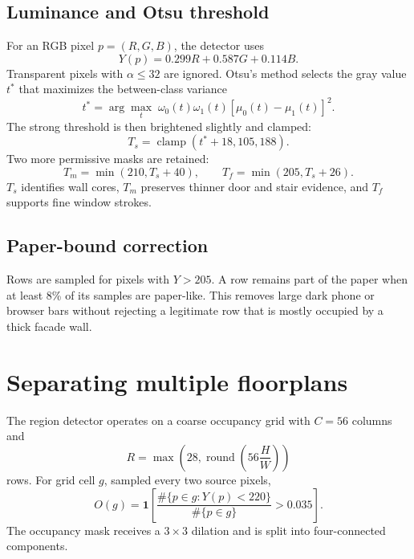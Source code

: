 \documentclass[11pt,a4paper]{article}
\newcommand{\ind}{\mathbf{1}}
\newcommand{\clamp}{\operatorname{clamp}}
\begin{document}
\subsection{Luminance and Otsu threshold}

For an RGB pixel $p=(R,G,B)$, the detector uses
\begin{equation}
Y(p)=0.299R+0.587G+0.114B.
\end{equation}
Transparent pixels with $\alpha\leq 32$ are ignored. Otsu's method selects the gray value $t^*$ that maximizes the between-class variance
\begin{equation}
t^*=\arg\max_t\;\omega_0(t)\omega_1(t)\left[\mu_0(t)-\mu_1(t)\right]^2.
\end{equation}
The strong threshold is then brightened slightly and clamped:
\begin{equation}
T_s=\clamp(t^*+18,105,188).
\end{equation}
Two more permissive masks are retained:
\begin{equation}
T_m=\min(210,T_s+40),\qquad T_f=\min(205,T_s+26).
\end{equation}
$T_s$ identifies wall cores, $T_m$ preserves thinner door and stair evidence, and $T_f$ supports fine window strokes.

\subsection{Paper-bound correction}

Rows are sampled for pixels with $Y>205$. A row remains part of the paper when at least 8\% of its samples are paper-like. This removes large dark phone or browser bars without rejecting a legitimate row that is mostly occupied by a thick facade wall.

\section{Separating multiple floorplans}

The region detector operates on a coarse occupancy grid with $C=56$ columns and
\begin{equation}
R=\max\left(28,\operatorname{round}\left(56\frac{H}{W}\right)\right)
\end{equation}
rows. For grid cell $g$, sampled every two source pixels,
\begin{equation}
O(g)=\ind\left[\frac{\#\{p\in g:Y(p)<220\}}{\#\{p\in g\}}>0.035\right].
\end{equation}
The occupancy mask receives a $3\times3$ dilation and is split into four-connected components.
\end{document}
